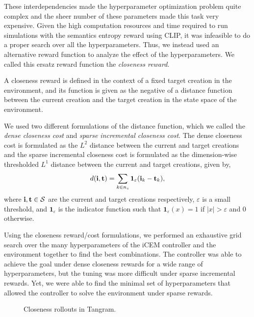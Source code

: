 These interdependencies made the hyperparameter optimization problem quite complex and the sheer number of these parameters made this task very expensive.
Given the high computation resources and time required to run simulations with the semantics entropy reward using CLIP, it was infeasible to do a proper search over all the hyperparameters.
Thus, we instead used an alternative reward function to analyze the effect of the hyperparameters.
We called this ersatz reward function the \emph{closeness reward}.

A closeness reward is defined in the context of a fixed target creation in the environment, and its function is given as the negative of a distance function between the current creation and the target creation in the state space of the environment.

We used two different formulations of the distance function, which we called the \emph{dense closeness cost} and \emph{sparse incremental closeness cost}.
The dense closeness cost is formulated as the \(L^2\) distance between the current and target creations and the sparse incremental closeness cost is formulated as the dimension-wise thresholded \(L^1\) distance between the current and target creations, given by,
\begin{equation}
    \label{eq:closeness-reward-sparse}
    d(\mathbf{i}, \mathbf{t}) = \sum_{k \in n_s} \bm{1}_\varepsilon(\mathbf{i}_k - \mathbf{t}_k),
\end{equation}
where \(\mathbf{i}, \mathbf{t} \in \mathcal{S}\) are the current and target creations respectively, \(\varepsilon\) is a small threshold, and \(\bm{1}_\varepsilon\) is the indicator function such that \(\bm{1}_\varepsilon(x) = 1\) if \(|x| > \varepsilon\) and \(0\) otherwise.

Using the closeness reward/cost formulations, we performed an exhaustive grid search over the many hyperparameters of the iCEM controller and the environment together to find the best combinations.
The controller was able to achieve the goal under dense closeness rewards for a wide range of hyperparameters, but the tuning was more difficult under sparse incremental rewards.
Yet, we were able to find the minimal set of hyperparameters that allowed the controller to solve the environment under sparse rewards.

\begin{figure}[H]
    \centering
    \caption{Closeness rollouts in Tangram.}
    \label{fig:closeness-rollouts}
\end{figure}

